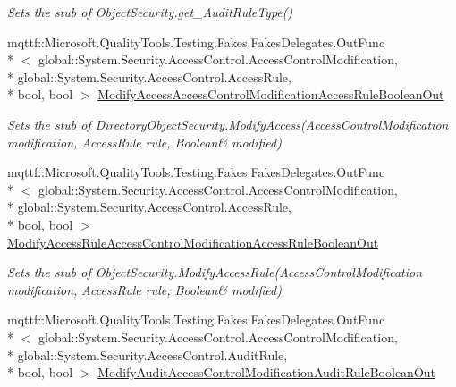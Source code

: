 \begin{DoxyCompactItemize}
\begin{DoxyCompactList}\small\item\em Sets the stub of Object\-Security.\-get\-\_\-\-Audit\-Rule\-Type()\end{DoxyCompactList}\item 
mqttf\-::\-Microsoft.\-Quality\-Tools.\-Testing.\-Fakes.\-Fakes\-Delegates.\-Out\-Func\\*
$<$ global\-::\-System.\-Security.\-Access\-Control.\-Access\-Control\-Modification, \\*
global\-::\-System.\-Security.\-Access\-Control.\-Access\-Rule, \\*
bool, bool $>$ \hyperlink{class_system_1_1_security_1_1_access_control_1_1_fakes_1_1_stub_directory_object_security_a812c5257ddc075038aae00dafa60d479}{Modify\-Access\-Access\-Control\-Modification\-Access\-Rule\-Boolean\-Out}
\begin{DoxyCompactList}\small\item\em Sets the stub of Directory\-Object\-Security.\-Modify\-Access(Access\-Control\-Modification modification, Access\-Rule rule, Boolean\& modified)\end{DoxyCompactList}\item 
mqttf\-::\-Microsoft.\-Quality\-Tools.\-Testing.\-Fakes.\-Fakes\-Delegates.\-Out\-Func\\*
$<$ global\-::\-System.\-Security.\-Access\-Control.\-Access\-Control\-Modification, \\*
global\-::\-System.\-Security.\-Access\-Control.\-Access\-Rule, \\*
bool, bool $>$ \hyperlink{class_system_1_1_security_1_1_access_control_1_1_fakes_1_1_stub_directory_object_security_a4f450e6a7f70fd136c33abae302c97e9}{Modify\-Access\-Rule\-Access\-Control\-Modification\-Access\-Rule\-Boolean\-Out}
\begin{DoxyCompactList}\small\item\em Sets the stub of Object\-Security.\-Modify\-Access\-Rule(Access\-Control\-Modification modification, Access\-Rule rule, Boolean\& modified)\end{DoxyCompactList}\item 
mqttf\-::\-Microsoft.\-Quality\-Tools.\-Testing.\-Fakes.\-Fakes\-Delegates.\-Out\-Func\\*
$<$ global\-::\-System.\-Security.\-Access\-Control.\-Access\-Control\-Modification, \\*
global\-::\-System.\-Security.\-Access\-Control.\-Audit\-Rule, \\*
bool, bool $>$ \hyperlink{class_system_1_1_security_1_1_access_control_1_1_fakes_1_1_stub_directory_object_security_a593a0f2163482e808d00fa83bb298b93}{Modify\-Audit\-Access\-Control\-Modification\-Audit\-Rule\-Boolean\-Out}

\end{DoxyCompactItemize}
